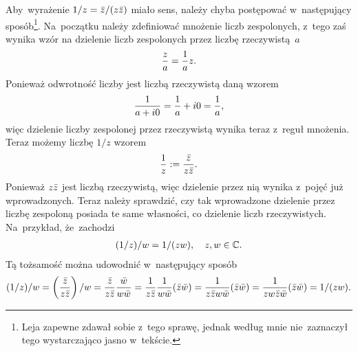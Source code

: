 \documentclass[a4paper,11pt]{article}
\begin{document}
\start {} Aby~wyrażenie $1 / z = \bar{ z } / ( z \bar{ z } )$ miało
sens, należy chyba postępować w~następujący sposób\footnote{Leja
  zapewne zdawał sobie z~tego sprawę, jednak według mnie nie~zaznaczył
  tego wystarczająco jasno w~tekście.}. Na~początku należy zdefiniować
mnożenie liczb zespolonych, z~tego zaś wynika wzór na dzielenie liczb
zespolonych przez liczbę rzeczywistą~$a$
\begin{equation}
  \label{eq:1}
  \begin{split}
    \frac{ z }{ a } = \frac{ 1 }{  a  } z.
  \end{split}
\end{equation}
Ponieważ odwrotność liczby jest liczbą rzeczywistą daną wzorem
\begin{equation}
  \label{eq:2}
  \begin{split}
    \frac{ 1 }{  a + i0  } = \frac{ 1 }{  a  } + i0 = \frac{ 1 }{  a  },
  \end{split}
\end{equation}
więc dzielenie liczby zespolonej przez rzeczywistą wynika teraz
z~reguł mnożenia. Teraz możemy  liczbę $1 / z$ wzorem
\begin{equation}
  \label{eq:3}
  \begin{split}
    \frac{ 1 }{  z  } := \frac{ \bar{ z } }{ z \bar{ z } }.
  \end{split}
\end{equation}
Ponieważ $z \bar{ z }$ jest liczbą rzeczywistą, więc dzielenie przez nią
wynika z~pojęć już wprowadzonych. Teraz należy sprawdzić, czy tak
wprowadzone dzielenie przez liczbę zespoloną posiada te same
własności, co dzielenie liczb rzeczywistych. Na~przykład, że~zachodzi
\begin{equation}
  \label{eq:4}
  \begin{split}
    ( 1 / z ) / w = 1 / ( z w ), \quad z, w \in \mathbb{C}.
  \end{split}
\end{equation}
Tą tożsamość można udowodnić w~następujący sposób
\begin{equation}
  \label{eq:5}
  \begin{split}
    ( 1 / z ) / w = \left( \frac{ \bar{ z } }{ z \bar{ z } } \right) / w = \frac{
      \bar{ z } }{ z \bar{ z } } \frac{ \bar{ w } }{ w \bar{ w } } = \frac{ 1 }{  z \bar{ z }  }
    \frac{ 1 }{  w \bar{ w }  } ( \bar{ z } \bar{ w } ) = \frac{ 1 }{  z \bar{ z } w \bar{ w }  } (
    \bar{ z } \bar{ w } ) = \frac{ 1 }{  z w \bar{ z } \bar{ w }  } ( \bar{ z } \bar{ w } ) = 1 / (
    z w ).
  \end{split}
\end{equation}

\vspace{\spaceFour}
\end{document}
